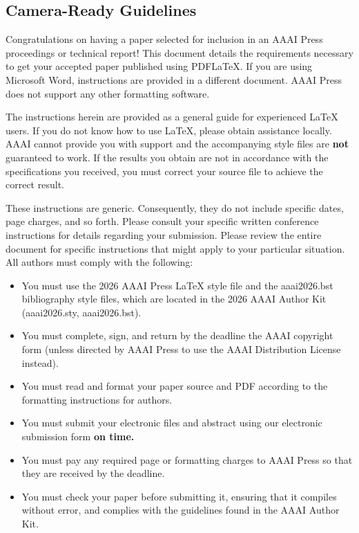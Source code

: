 \subsection{Camera-Ready Guidelines}\label{camera-ready-guidelines}

Congratulations on having a paper selected for inclusion in an AAAI
Press proceedings or technical report! This document details the
requirements necessary to get your accepted paper published using
PDF{\LaTeX}. If you are using Microsoft Word, instructions are provided
in a different document. AAAI Press does not support any other
formatting software.

The instructions herein are provided as a general guide for experienced
{\LaTeX} users. If you do not know how to use {\LaTeX}, please obtain
assistance locally. AAAI cannot provide you with support and the
accompanying style files are \textbf{not} guaranteed to work. If the
results you obtain are not in accordance with the specifications you
received, you must correct your source file to achieve the correct
result.

These instructions are generic. Consequently, they do not include
specific dates, page charges, and so forth. Please consult your specific
written conference instructions for details regarding your submission.
Please review the entire document for specific instructions that might
apply to your particular situation. All authors must comply with the
following:

\begin{itemize}
\tightlist
\item
  You must use the 2026 AAAI Press {\LaTeX} style file and the
  aaai2026.bst bibliography style files, which are located in the 2026
  AAAI Author Kit (aaai2026.sty, aaai2026.bst).
\item
  You must complete, sign, and return by the deadline the AAAI copyright
  form (unless directed by AAAI Press to use the AAAI Distribution
  License instead).
\item
  You must read and format your paper source and PDF according to the
  formatting instructions for authors.
\item
  You must submit your electronic files and abstract using our
  electronic submission form \textbf{on time.}
\item
  You must pay any required page or formatting charges to AAAI Press so
  that they are received by the deadline.
\item
  You must check your paper before submitting it, ensuring that it
  compiles without error, and complies with the guidelines found in the
  AAAI Author Kit.
\end{itemize}

